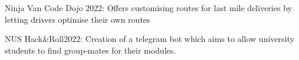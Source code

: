 

\begin{cvskills}
    \cvskill
    {Ninja Van Code Dojo 2022:} %
    {Offers customising routes for last mile deliveries by letting drivers optimise their own routes} %

    \cvskill
    {NUS Hack\&Roll2022:} %
    {Creation of a telegram bot which aims to allow university students to find group-mates for their modules.} %

\end{cvskills}
